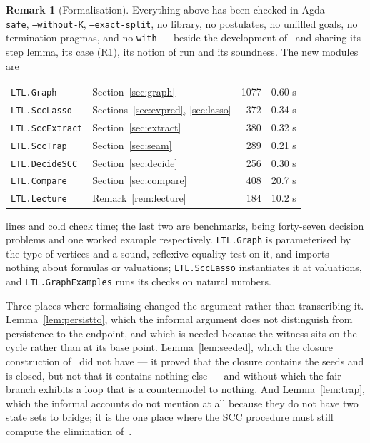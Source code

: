 \documentclass[11pt,a4paper]{article}
\theoremstyle{definition}
\newtheorem{remark}[theorem]{Remark}
\begin{document}
\begin{remark}[Formalisation]
Everything above has been checked in Agda --- \texttt{--safe},
\texttt{--without-K}, \texttt{--exact-split}, no library, no postulates, no
unfilled goals, no termination pragmas, and no \texttt{with} --- beside the
development of~\cite{m4} and sharing its step lemma, its case (R1), its notion
of run and its soundness.  The new modules are
\begin{center}
\begin{tabular}{llrr}
\texttt{LTL.Graph}      & Section~\ref{sec:graph}     & 1077 & 0.60 s\\
\texttt{LTL.SccLasso}   & Sections~\ref{sec:evpred}, \ref{sec:lasso}
                                                      &  372 & 0.34 s\\
\texttt{LTL.SccExtract} & Section~\ref{sec:extract}   &  380 & 0.32 s\\
\texttt{LTL.SccTrap}    & Section~\ref{sec:seam}      &  289 & 0.21 s\\
\texttt{LTL.DecideSCC}  & Section~\ref{sec:decide}    &  256 & 0.30 s\\
\texttt{LTL.Compare}    & Section~\ref{sec:compare}   &  408 & 20.7 s\\
\texttt{LTL.Lecture}    & Remark~\ref{rem:lecture}    &  184 & 10.2 s\\
\end{tabular}
\end{center}
lines and cold check time; the last two are benchmarks, being forty-seven
decision problems and one worked example respectively.  \texttt{LTL.Graph}
is parameterised by the type of vertices and a sound, reflexive equality test
on it, and imports nothing about formulas or valuations; \texttt{LTL.SccLasso}
instantiates it at valuations, and \texttt{LTL.GraphExamples} runs its checks
on natural numbers.

Three places where formalising changed the argument rather than transcribing
it.  Lemma~\ref{lem:persistto}, which the informal argument does not
distinguish from persistence to the endpoint, and which is needed because the
witness sits on the cycle rather than at its base point.
Lemma~\ref{lem:seeded}, which the closure construction of~\cite{m4} did not
have --- it proved that the closure contains the seeds and is closed, but not
that it contains nothing else --- and without which the fair branch exhibits a
loop that is a countermodel to nothing.  And Lemma~\ref{lem:trap}, which the
informal accounts do not mention at all because they do not have two state
sets to bridge; it is the one place where the SCC procedure must still compute
the elimination of~\cite{m4}.
\end{remark}
\end{document}
